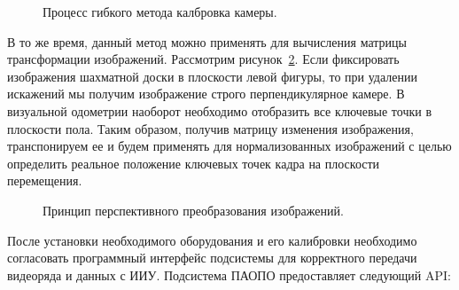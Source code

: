 \begin{figure}[!h]
\caption{Процесс гибкого метода калбровка камеры.}
\label{pic:calibrationMan}
\end{figure}

В то же время, данный метод можно применять для вычисления матрицы трансформации изображений. Рассмотрим рисунок~\ref{pic:perspectiveTranform}. Если фиксировать изображения шахматной доски в плоскости левой фигуры, то при удалении искажений мы получим изображение строго перпендикулярное камере. В визуальной одометрии наоборот необходимо отобразить все ключевые точки в плоскости пола. Таким образом, получив матрицу изменения изображения, транспонируем ее и будем применять для нормализованных изображений с целью определить реальное положение ключевых точек кадра на плоскости перемещения. 

\begin{figure}[!h]
\caption{Принцип перспективного преобразования изображений.}
\label{pic:perspectiveTranform}
\end{figure}

После установки необходимого оборудования и его калибровки необходимо согласовать программный интерфейс подсистемы для корректного передачи видеоряда и данных с ИИУ. 
Подсистема ПАОПО предоставляет следующий API:

